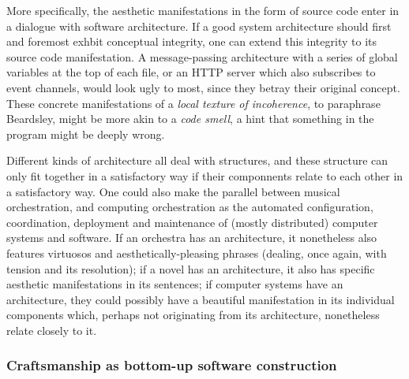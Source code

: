\documentclass{article}
\begin{document}
More specifically, the aesthetic manifestations in the form of source code enter in a dialogue with software architecture. If a good system architecture should first and foremost exhbit conceptual integrity\cite{spinellis_beautiful_2009}, one can extend this integrity to its source code manifestation. A message-passing architecture with a series of global variables at the top of each file, or an HTTP server which also subscribes to event channels, would look ugly to most, since they betray their original concept. These concrete manifestations of a \emph{local texture of incoherence}, to paraphrase Beardsley, might be more akin to a \emph{code smell}, a hint that something in the program might be deeply wrong.

Different kinds of architecture all deal with structures, and these structure can only fit together in a satisfactory way if their componnents relate to each other in a satisfactory way. One could also make the parallel between musical orchestration, and computing orchestration as the automated configuration, coordination, deployment and maintenance of (mostly distributed) computer systems and software. If an orchestra has an architecture, it nonetheless also features virtuosos and aesthetically-pleasing phrases (dealing, once again, with tension and its resolution); if a novel has an architecture, it also has specific aesthetic manifestations in its sentences; if computer systems have an architecture, they could possibly have a beautiful manifestation in its individual components which, perhaps not originating from its architecture, nonetheless relate closely to it.

\subsubsection{Craftsmanship as bottom-up software construction}
\end{document}
